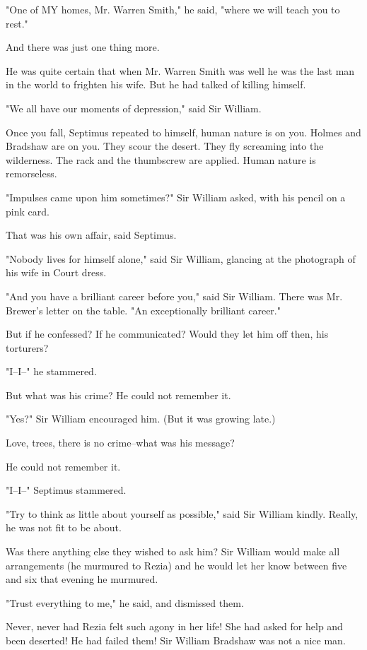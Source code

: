 \documentclass[lang=cn,10pt]{elegantbook}
\begin{document}
"One of MY homes, Mr. Warren Smith," he said, "where we will teach
you to rest."

And there was just one thing more.

He was quite certain that when Mr. Warren Smith was well he was the
last man in the world to frighten his wife.  But he had talked of
killing himself.

"We all have our moments of depression," said Sir William.

Once you fall, Septimus repeated to himself, human nature is on
you.  Holmes and Bradshaw are on you.  They scour the desert.  They
fly screaming into the wilderness.  The rack and the thumbscrew are
applied.  Human nature is remorseless.

"Impulses came upon him sometimes?" Sir William asked, with his
pencil on a pink card.

That was his own affair, said Septimus.

"Nobody lives for himself alone," said Sir William, glancing at the
photograph of his wife in Court dress.

"And you have a brilliant career before you," said Sir William.
There was Mr. Brewer's letter on the table.  "An exceptionally
brilliant career."

But if he confessed?  If he communicated?  Would they let him off
then, his torturers?

"I--I--" he stammered.

But what was his crime?  He could not remember it.

"Yes?"  Sir William encouraged him.  (But it was growing late.)

Love, trees, there is no crime--what was his message?

He could not remember it.

"I--I--" Septimus stammered.

"Try to think as little about yourself as possible," said Sir
William kindly.  Really, he was not fit to be about.

Was there anything else they wished to ask him?  Sir William would
make all arrangements (he murmured to Rezia) and he would let her
know between five and six that evening he murmured.

"Trust everything to me," he said, and dismissed them.

Never, never had Rezia felt such agony in her life!  She had asked
for help and been deserted!  He had failed them!  Sir William
Bradshaw was not a nice man.
\end{document}
